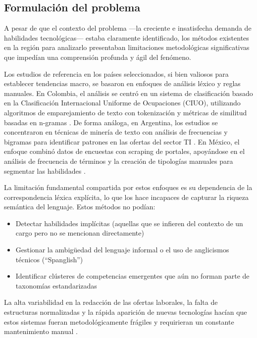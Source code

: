 \subsection{Formulación del problema}

A pesar de que el contexto del problema ---la creciente e insatisfecha demanda de habilidades tecnológicas--- estaba claramente identificado, los métodos existentes en la región para analizarlo presentaban limitaciones metodológicas significativas que impedían una comprensión profunda y ágil del fenómeno.

Los estudios de referencia en los países seleccionados, si bien valiosos para establecer tendencias macro, se basaron en enfoques de análisis léxico y reglas manuales. En Colombia, el análisis se centró en un sistema de clasificación basado en la Clasificación Internacional Uniforme de Ocupaciones (CIUO), utilizando algoritmos de emparejamiento de texto con tokenización y métricas de similitud basadas en n-gramas \parencite{rubio2024}. De forma análoga, en Argentina, los estudios se concentraron en técnicas de minería de texto con análisis de frecuencias y bigramas para identificar patrones en las ofertas del sector TI \parencite{aguilera2018}. En México, el enfoque combinó datos de encuestas con scraping de portales, apoyándose en el análisis de frecuencia de términos y la creación de tipologías manuales para segmentar las habilidades \parencite{martinez2024}.

La limitación fundamental compartida por estos enfoques es su dependencia de la correspondencia léxica explícita, lo que los hace incapaces de capturar la riqueza semántica del lenguaje. Estos métodos no podían:

\begin{itemize}
    \item Detectar habilidades implícitas (aquellas que se infieren del contexto de un cargo pero no se mencionan directamente)
    \item Gestionar la ambigüedad del lenguaje informal o el uso de anglicismos técnicos (``Spanglish'')
    \item Identificar clústeres de competencias emergentes que aún no forman parte de taxonomías estandarizadas
\end{itemize}

La alta variabilidad en la redacción de las ofertas laborales, la falta de estructuras normalizadas y la rápida aparición de nuevas tecnologías hacían que estos sistemas fueran metodológicamente frágiles y requirieran un constante mantenimiento manual \parencite{echeverria2022}.

